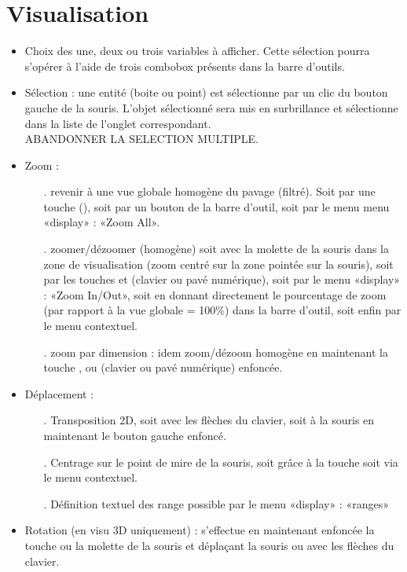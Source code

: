 \documentclass[a4paper]{article}
\begin{document}
\section{Visualisation }\label{sec:visualisation}
\begin{itemize}
\item Choix des une, deux ou trois variables à afficher. Cette sélection pourra s'opérer à l'aide de trois combobox présents dans la barre d'outils.
\item Sélection : une entité (boite ou point) est sélectionne par un clic du bouton gauche de la souris. L'objet sélectionné sera mis en surbrillance et sélectionne dans la liste de l'onglet correspondant.\\ ABANDONNER LA SELECTION MULTIPLE.
\item Zoom :
  \begin{itemize}
  \item[.] revenir à une vue globale homogène du pavage (filtré). Soit par une touche (), soit par un bouton de la barre d'outil, soit par le menu menu «display» : «Zoom All».
  \item[.] zoomer/dézoomer (homogène) soit avec la molette de la souris dans la zone de visualisation (zoom centré sur la zone pointée sur la souris), soit par les touches \keystroke{+} et \keystroke{-} (clavier ou pavé numérique), soit par le menu «display» : «Zoom In/Out», soit en donnant directement le pourcentage de zoom (par rapport à la vue globale = 100\%) dans la barre d'outil, soit enfin par le menu contextuel.
  \item[.] zoom par dimension : idem zoom/dézoom homogène en maintenant la touche ,  ou  (clavier ou pavé numérique) enfoncée.
  \end{itemize}
\item Déplacement :
  \begin{itemize}
  \item[.] Transposition 2D, soit avec les flèches du clavier, soit à la souris en maintenant le bouton gauche enfoncé.
  \item[.] Centrage sur le point de mire de la souris, soit grâce à la touche  soit via le menu contextuel.
  \item[.] Définition textuel des range possible par le menu «display» : «ranges»
  \end{itemize}
\item Rotation (en visu 3D uniquement) : s'effectue en maintenant enfoncée la touche \Alt ou la molette de la souris et déplaçant la souris ou avec les flèches du clavier.
\end{itemize}
\end{document}
